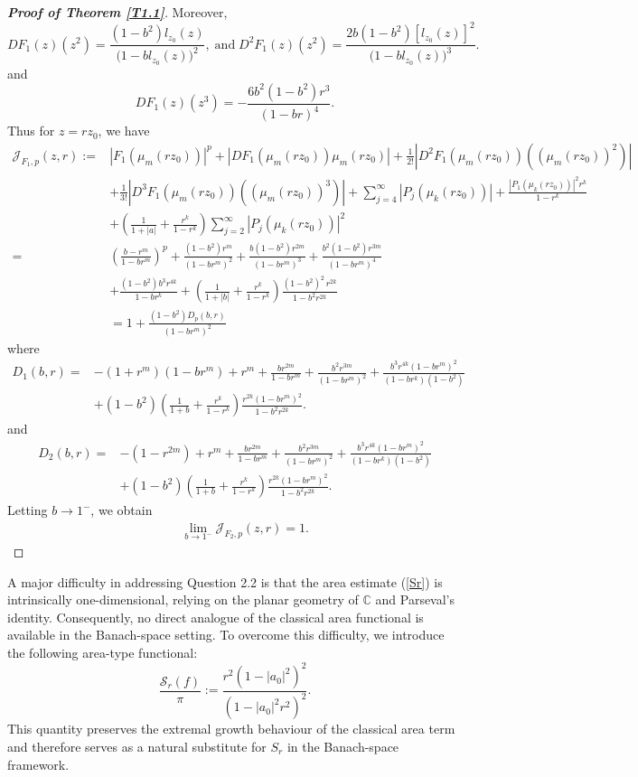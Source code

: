 \documentclass[11pt, reqno]{amsart}
\newtheorem*{cor A}{Corollary A}
\newtheorem*{cor B}{Corollary B}
\newcommand{\beas}{\begin{eqnarray*}}
\newcommand{\eeas}{\end{eqnarray*}}
\numberwithin{equation}{section}
\begin{document}
\begin{proof}[{\bf Proof of Theorem \ref{T1.1}}]
Moreover,
\[
DF_1(z)(z^2)
=\frac{(1-b^2)l_{z_0}(z)}
{\bigl(1-bl_{z_0}(z)\bigr)^2}, \;\text{and}\; D^2F_1(z)(z^2)
=\frac{2b(1-b^2)[l_{z_0}(z)]^2}
{\bigl(1-bl_{z_0}(z)\bigr)^3}.
\]
and
\[DF_1(z)(z^3)=-\frac{6b^2(1-b^2)r^3}{(1-br)^4}.\]
Thus for $z=rz_0$, we have 
\begin{align*}
\mathcal{J}_{F_1,p}(z,r):=&|F_1(\mu_m(rz_0))|^p+|D F_1(\mu_m(rz_0))\mu_m(rz_0)|+\frac{1}{2!}|D^2 F_1(\mu_m(rz_0)) ((\mu_m(rz_0))^2)|\\
&+\frac{1}{3!}|D^3 F_1(\mu_m(rz_0)) ((\mu_m(rz_0))^3)|+\sum_{j=4}^{\infty}|P_j(\mu_k(rz_0))|+\frac{|P_1(\mu_k(rz_0))|^2r^{k}}{1-r^k}\\
&+\left(\frac{1}{1+|a|}+\frac{r^k}{1-r^k}\right)\sum_{j=2}^{\infty}|P_j(\mu_k(rz_0))|^2 \\
=&\left(\frac{b-r^m}{1-br^m}\right)^p+\frac{(1-b^2)r^m}{(1-br^m)^2}+\frac{b(1-b^2)r^{2m}}{(1-br^m)^3}+\frac{b^2(1-b^2)r^{3m}}{(1-br^m)^4}\\
&+\frac{(1-b^2)b^3r^{4k}}{1-br^k}+\left(\frac{1}{1+|b|}+\frac{r^k}{1-r^k}\right)\frac{(1-b^2)^2\,r^{2k}}{1-b^2r^{2k}}\\
&=1+\frac{(1-b^2)D_{p}(b,r)}{(1-br^m)^2}
\end{align*}
where
\[
\begin{aligned}
D_1(b,r)
=&-(1+r^m)(1-br^m)
+r^m+\frac{br^{2m}}{1-br^m}
+\frac{b^2r^{3m}}{(1-br^m)^2}+\frac{b^3r^{4k}(1-br^m)^2}
{(1-br^k)(1-b^2)}
\\
&+(1-b^2)
\left(\frac{1}{1+b}+\frac{r^k}{1-r^k}\right)
\frac{r^{2k}(1-br^m)^2}
{1-b^2r^{2k}}.
\end{aligned}
\]
and 
\[
\begin{aligned}
D_2(b,r)
=&-(1-r^{2m})
+r^m+\frac{br^{2m}}{1-br^m}
+\frac{b^2r^{3m}}{(1-br^m)^2}
+\frac{b^3r^{4k}(1-br^m)^2}
{(1-br^k)(1-b^2)}\\
&+(1-b^2)
\left(\frac{1}{1+b}+\frac{r^k}{1-r^k}\right)
\frac{r^{2k}(1-br^m)^2}
{1-b^2r^{2k}}.
\end{aligned}
\]
Letting $b\to1^-$, we obtain
\beas
&&\lim_{b\to1^-}\mathcal{J}_{F_2,p}(z,r)=1.\eeas

\end{proof}

A major difficulty in addressing Question 2.2 is that the area estimate (\ref{Sr}) is intrinsically one-dimensional, relying on the planar geometry of $\mathbb C$ and Parseval's identity. Consequently, no direct analogue of the classical area functional is available in the Banach-space setting. To overcome this difficulty, we introduce the following area-type functional:
\[
\frac{\mathcal S_r(f)}{\pi}
:=
\frac{r^2(1-|a_0|^2)^2}
{(1-|a_0|^2r^2)^2}.
\]
This quantity preserves the extremal growth behaviour of the classical area term and therefore serves as a natural substitute for $S_r$ in the Banach-space framework.
\end{document}
